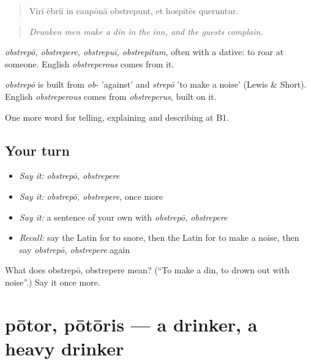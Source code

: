 \begin{quote}
Virī ēbriī in caupōnā obstrepunt, et hospitēs queruntur.
\end{quote}

\begin{quote}
\emph{Drunken men make a din in the inn, and the guests complain.}
\end{quote}

\emph{obstrepō, obstrepere, obstrepuī, obstrepitum}, often with a dative: to roar at someone. English \emph{obstreperous} comes from it.

\begin{cousinweb}
\emph{obstrepō} is built from \emph{ob-} 'against' and \emph{strepō} 'to make a noise' (Lewis \& Short). English \emph{obstreperous} comes from \emph{obstreperus}, built on it.
\end{cousinweb}

\begin{grammarlens}[title={What you've built}]
One more word for telling, explaining and describing at B1.
\end{grammarlens}

\subsection*{Your turn}
\begin{itemize}
\raggedright
  \item \emph{Say it:} \emph{obstrepō, obstrepere}
  \item \emph{Say it:} \emph{obstrepō, obstrepere}, once more
  \item \emph{Say it:} a sentence of your own with \emph{obstrepō, obstrepere}
  \item \emph{Recall:} say the Latin for to snore, then the Latin for to make a noise, then say \emph{obstrepō, obstrepere} again
\end{itemize}

\begin{tcolorbox}[breakable,colback=teal!4,colframe=teal!35!black,title={Before you move on}]
What does obstrepō, obstrepere mean? (\textquotedblleft{}To make a din, to drown out with noise\textquotedblright{}.) Say it once more.
\end{tcolorbox}
\section[pōtor, pōtōris]{pōtor, pōtōris — a drinker, a heavy drinker}

